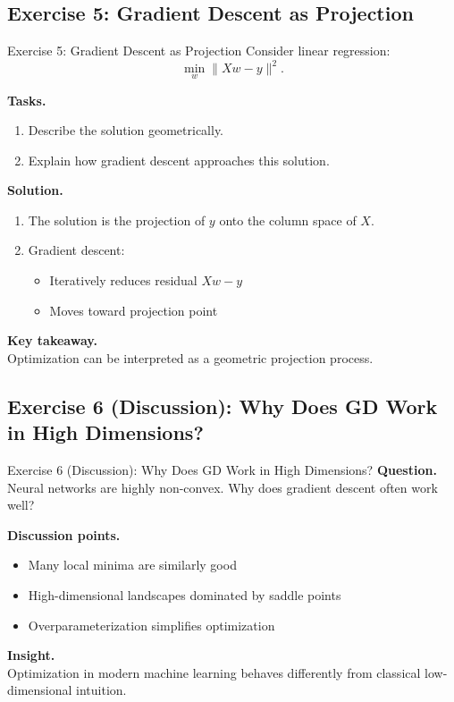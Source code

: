 \documentclass[aspectratio=169,11pt]{beamer}
\begin{document}
\subsection{Exercise 5: Gradient Descent as Projection}
\begin{frame}[t,allowframebreaks]{Exercise 5: Gradient Descent as Projection}
\small
Consider linear regression:
\[
\min_w \|Xw - y\|^2.
\]

\textbf{Tasks.}\\ \begin{enumerate}
    \item Describe the solution geometrically.
    \item Explain how gradient descent approaches this solution.
\end{enumerate}

\textbf{Solution.}\\ \begin{enumerate}
\item The solution is the projection of $y$ onto the column space of $X$.

\item Gradient descent:
\begin{itemize}
    \item Iteratively reduces residual $Xw - y$
    \item Moves toward projection point
\end{itemize}
\end{enumerate}

\textbf{Key takeaway.}\\ Optimization can be interpreted as a geometric projection process.
\end{frame}

\subsection{Exercise 6 (Discussion): Why Does GD Work in High Dimensions?}
\begin{frame}[t,allowframebreaks]{Exercise 6 (Discussion): Why Does GD Work in High Dimensions?}
\small
\textbf{Question.}\\ Neural networks are highly non-convex. Why does gradient descent often work well?

\textbf{Discussion points.}\\ \begin{itemize}
    \item Many local minima are similarly good
    \item High-dimensional landscapes dominated by saddle points
    \item Overparameterization simplifies optimization
\end{itemize}

\textbf{Insight.}\\ Optimization in modern machine learning behaves differently from classical low-dimensional intuition.
\end{frame}
\end{document}
